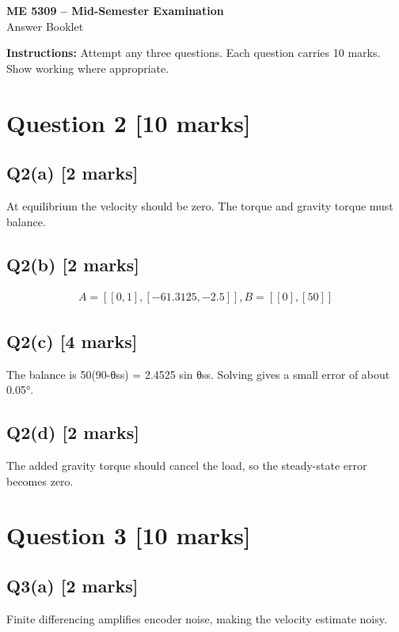 \documentclass[11pt,a4paper]{article}
\begin{document}
\begin{center}
{\Large\bfseries ME 5309 -- Mid-Semester Examination}\\[3pt]
{\large Answer Booklet}\\[8pt]
\end{center}
\textbf{Instructions:} Attempt any three questions. Each question carries 10 marks. Show working where appropriate.
\section*{Question 2 \hfill [10 marks]}
\subsection*{Q2(a) \hfill [2 marks]}

At equilibrium the velocity should be zero.
The torque and gravity torque must balance.

\subsection*{Q2(b) \hfill [2 marks]}

\[\begin{aligned}A = [[0,1], [-61.3125,-2.5]], B = [[0],[50]]\end{aligned}\]

\subsection*{Q2(c) \hfill [4 marks]}

The balance is 50(90-θss) = 2.4525 sin θss.
Solving gives a small error of about 0.05°.

\subsection*{Q2(d) \hfill [2 marks]}

The added gravity torque should cancel the load, so the steady-state error becomes zero. 
\section*{Question 3 \hfill [10 marks]}
\subsection*{Q3(a) \hfill [2 marks]}

Finite differencing amplifies encoder noise, making the velocity estimate noisy.
\end{document}
